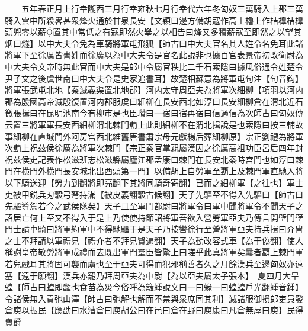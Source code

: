 　　五年春正月上行幸隴西三月行幸雍秋七月行幸代六年冬匈奴三萬騎入上郡三萬騎入雲中所殺畧甚衆烽火通於甘泉長安【文穎曰邊方備胡寇作高土櫓上作桔橰桔橰頭兜零以薪置其中常低之有寇即然火舉之以相告曰烽又多積薪寇至即然之以望其烟曰燧】以中大夫令免為車騎將軍屯飛狐【師古曰中大夫官名其人姓令名免耳此諸將軍下至徐厲皆書姓而徐廣以為中大夫令是官名此說非也據百官表景帝初改衛尉為中大夫令文帝時無此官而中大夫是郎中令屬官秩比二千石索隱曰據風俗通令姓楚令尹子文之後虞世南曰中大夫令是史家追書耳】故楚相蘇意為將軍屯句注【句音鈎】將軍張武屯北地【秦滅義渠置北地郡】河内太守周亞夫為將軍次細柳【項羽以河内郡為殷國高帝滅殷復置河内郡服䖍曰細柳在長安西北如淳曰長安細柳倉在渭北近石徼張揖曰在昆明池南今有柳市是也臣瓚曰一宿曰宿再宿曰信過信為次師古曰匈奴傳云置三將軍軍長安西細柳渭北棘門覇上此則細柳不在渭北揖說是也索隱曰按三輔故事細柳在直城門外阿房宫西北維舊唐書肅宗母元獻楊后葬細柳原】宗正劉禮為將軍次覇上祝兹侯徐厲為將軍次棘門【宗正秦官掌親屬漢因之徐厲高祖功臣呂后四年封祝兹侯史記表作松滋班志松滋縣屬廬江郡孟康曰棘門在長安北秦時宫門也如淳曰棘門在横門外横門長安城北出西頭第一門】以備胡上自勞軍至覇上及棘門軍直馳入將以下騎送迎【勞力到翻將即亮翻下其將同騎奇寄翻】已而之細柳軍【之往也】軍士吏被甲鋭兵刃彀弓弩持滿【被皮義翻彀古候翻】天子先驅至不得入先驅曰【師古曰先驅導駕若今之武侯隊矣】天子且至軍門都尉曰將軍令曰軍中聞將軍令不聞天子之詔居亡何上至又不得入于是上乃使使持節詔將軍吾欲入營勞軍亞夫乃傳言開壁門壁門士請車騎曰將軍約軍中不得馳驅于是天子乃按轡徐行至營將軍亞夫持兵揖曰介胄之士不拜請以軍禮見【禮介者不拜見賢遍翻】天子為動改容式車【為于偽翻】使人稱謝皇帝敬勞將軍成禮而去既出軍門羣臣皆驚上曰嗟乎此真將軍矣曩者覇上棘門軍若兒戲耳其將固可襲而虜也至于亞夫可得而犯邪稱善者久之月餘漢兵至邊匈奴亦遠塞【遠于願翻】漢兵亦罷乃拜周亞夫為中尉【為以亞夫屬太子張本】　夏四月大旱蝗【師古曰蝗即螽也食苗為災今俗呼為簸蝩說文曰一曰蝝一曰蝗蝗戶光翻蝩音鍾】令諸侯無入貢弛山澤【師古曰弛解也解而不禁與衆庶同其利】減諸服御損郎吏員發倉庾以振民【應劭曰水漕倉曰庾胡公曰在邑曰倉在野曰庾康曰凡倉無屋曰庾】民得賣爵

